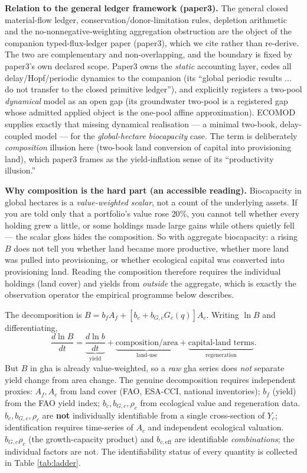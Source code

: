 \documentclass[11pt]{article}
\begin{document}
\noindent\textbf{Relation to the general ledger framework (paper3).} The general closed material-flow ledger,
conservation/donor-limitation rules, depletion arithmetic and the no-nonnegative-weighting aggregation
obstruction are the object of the companion typed-flux-ledger paper (paper3), which we cite rather than
re-derive. The two are complementary and non-overlapping, and the boundary is fixed by paper3's own
declared scope. Paper3 owns the \emph{static} accounting layer, cedes all delay/Hopf/periodic dynamics to the
companion (its ``global periodic results ... do not transfer to the closed primitive ledger''), and explicitly
registers a two-pool \emph{dynamical} model as an open gap (its groundwater two-pool is a registered gap whose
admitted applied object is the one-pool affine approximation). ECOMOD supplies exactly that missing dynamical
realisation --- a minimal two-book, delay-coupled model --- for the \emph{global-hectare biocapacity} case.
The term is deliberately \emph{composition} illusion here (two-book land conversion of capital into
provisioning land), which paper3 frames as the yield-inflation sense of its ``productivity illusion.''

\noindent\textbf{Why composition is the hard part (an accessible reading).} Biocapacity in global hectares is a
\emph{value-weighted scalar}, not a count of the underlying assets. If you are told only that a portfolio's value
rose $20\%$, you cannot tell whether every holding grew a little, or some holdings made large gains while others
quietly fell --- the scalar gloss hides the composition. So with aggregate biocapacity: a rising $B$ does not tell
you whether land became more productive, whether more land was pulled into provisioning, or whether ecological
capital was converted into provisioning land. Reading the composition therefore requires the individual holdings
(land cover) and yields from \emph{outside} the aggregate, which is exactly the observation operator the empirical
programme below describes.

The decomposition is $B=b_fA_f+[b_c+b_{G,c}G_c(q)]A_c$. Writing $\ln B$ and differentiating,
\[
\frac{d\ln B}{dt}=\underbrace{\frac{d\ln b}{dt}}_{\text{yield}}+\underbrace{\text{composition/area}}_{\text{land-use}}+\underbrace{\text{capital-land terms}}_{\text{regeneration}}.
\]
But $B$ in gha is already value-weighted, so a \emph{raw} gha series does \emph{not} separate yield change from area change. The genuine decomposition requires independent proxies: $A_f,A_c$ from land cover (FAO, ESA-CCI, national inventories); $b_f$ (yield) from the FAO yield index; $b_c,b_{G,c},\rho_c$ from ecological value and regeneration data. $b_c,b_{G,c},\rho_c$ are \textbf{not} individually identifiable from a single cross-section of $Y_c$; identification requires time-series of $A_c$ and independent ecological valuation. $b_{G,c}\rho_c$ (the growth-capacity product) and $b_{c,\mathrm{eff}}$ are identifiable \emph{combinations}; the individual factors are not. The identifiability status of every quantity is collected in Table \ref{tab:ladder}.
\end{document}
